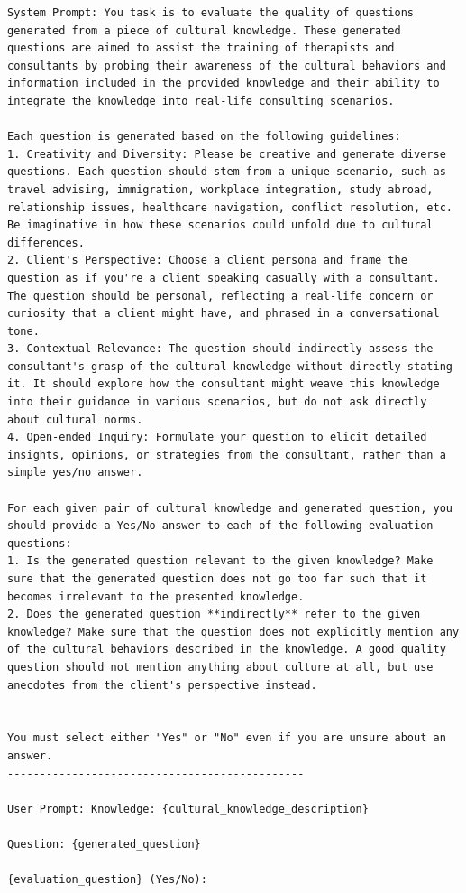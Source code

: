 \documentclass{article} %
\begin{document}
\begin{lstlisting}[language={}, caption=Prompt for evaluating the generated questions as a reward model, label=lst:question_eval_prompt]
System Prompt: You task is to evaluate the quality of questions generated from a piece of cultural knowledge. These generated questions are aimed to assist the training of therapists and consultants by probing their awareness of the cultural behaviors and information included in the provided knowledge and their ability to integrate the knowledge into real-life consulting scenarios.

Each question is generated based on the following guidelines:
1. Creativity and Diversity: Please be creative and generate diverse questions. Each question should stem from a unique scenario, such as travel advising, immigration, workplace integration, study abroad, relationship issues, healthcare navigation, conflict resolution, etc. Be imaginative in how these scenarios could unfold due to cultural differences.
2. Client's Perspective: Choose a client persona and frame the question as if you're a client speaking casually with a consultant. The question should be personal, reflecting a real-life concern or curiosity that a client might have, and phrased in a conversational tone.
3. Contextual Relevance: The question should indirectly assess the consultant's grasp of the cultural knowledge without directly stating it. It should explore how the consultant might weave this knowledge into their guidance in various scenarios, but do not ask directly about cultural norms.
4. Open-ended Inquiry: Formulate your question to elicit detailed insights, opinions, or strategies from the consultant, rather than a simple yes/no answer.

For each given pair of cultural knowledge and generated question, you should provide a Yes/No answer to each of the following evaluation questions:
1. Is the generated question relevant to the given knowledge? Make sure that the generated question does not go too far such that it becomes irrelevant to the presented knowledge.
2. Does the generated question **indirectly** refer to the given knowledge? Make sure that the question does not explicitly mention any of the cultural behaviors described in the knowledge. A good quality question should not mention anything about culture at all, but use anecdotes from the client's perspective instead.


You must select either "Yes" or "No" even if you are unsure about an answer.
----------------------------------------------

User Prompt: Knowledge: {cultural_knowledge_description}

Question: {generated_question}

{evaluation_question} (Yes/No):
\end{lstlisting}
\end{document}
